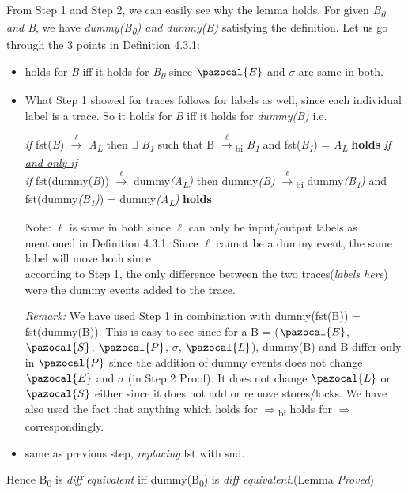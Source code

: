 \documentclass[11pt]{article}
\newcommand{\Sa}{\pazocal{S}}
\newcommand{\Lb}{\pazocal{L}}
\newcommand{\Ea}{\pazocal{E}}
\newcommand{\Pa}{\pazocal{P}}
\begin{document}
From Step 1 and Step 2, we can easily see why the lemma holds. For given {\it B\textsubscript{0} and B}, we have {\it dummy(B\textsubscript{0}) and dummy(B)} satisfying the definition. Let us go through the 3 points in Definition 4.3.1:
\begin{itemize}
  \item holds for {\it B} iff it holds for {\it B\textsubscript{0}} since $\Ea$ and $\sigma$ are same in both.
  \item What Step 1 showed for traces follows for labels as well, since each individual label is a trace. So it holds for {\it B} iff it holds for {\it dummy(B)} i.e. \newline

  {\it if} fst({\it B}) {$\xrightarrow[\text{}]{\text{$\ell$}}$} {\it A}\textsubscript{{\it L}} then {$\exists$} {\it B\textsubscript{1}} such that 
  B {$\xrightarrow[\text{}]{\text{$\ell$}}$}{\textsubscript{bi}} {\it B\textsubscript{1}} and fst({\it B\textsubscript{1}}) = {\it A}\textsubscript{{\it L}} {\bf holds} \underline{{\it if and only if}}\\
  {\it if} fst(dummy({\it B})) {$\xrightarrow[\text{}]{\text{$\ell$}}$} dummy{\it (A\textsubscript{L})} then dummy{\it (B)} {$\xrightarrow[\text{}]{\text{$\ell$}}$}{\textsubscript{bi}} dummy{\it (B\textsubscript{1})} and fst(dummy{\it (B\textsubscript{1})}) = dummy{\it (A\textsubscript{L})} {\bf holds}\newline

  Note: $\ell$ is same in both since $\ell$ can only be input/output labels as mentioned in Definition \hspace*{26pt} 4.3.1. Since $\ell$ cannot be a dummy event, the same label will move both since \\ \hspace*{26pt}according to Step 1, the only difference between the two traces({\it labels here}) were the \hspace*{26pt}dummy events added to the trace.\newline

  {\it Remark: } We have used Step 1 in combination with dummy(fst(B)) = fst(dummy(B)). This is easy to see since for a B = ($\Ea$, $\Sa$, $\Pa$, $\sigma$, $\Lb$), dummy(B) and B differ only in $\Pa$ since the addition of dummy events does not change $\Ea$ and $\sigma$ (in Step 2 Proof). It does not change $\Lb$ or $\Sa$ either since it does not add or remove stores/locks.\newline
  We have also used the fact that anything which holds for $\Rightarrow$\textsubscript{bi} holds for $\Rightarrow$ correspondingly.\newline

  \item same as previous step, {\it replacing} fst with snd. \newline
\end{itemize}
Hence B\textsubscript{0} is {\it diff equivalent} iff dummy(B\textsubscript{0}) is {\it diff equivalent}.\hfill \hfill (Lemma {\it Proved})\newline
\end{document}
